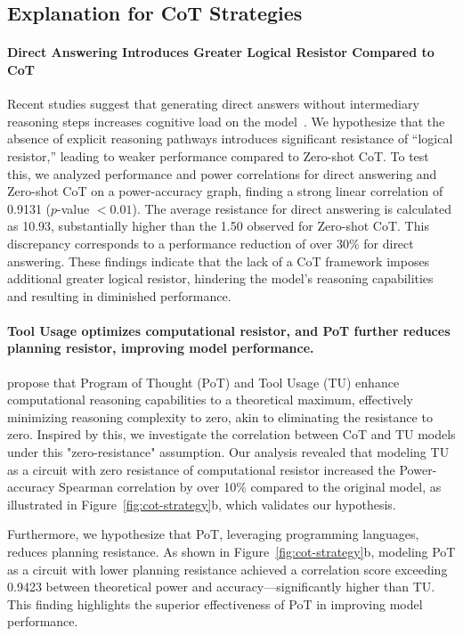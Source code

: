 \subsection{Explanation for CoT Strategies}
\paragraph{Direct Answering Introduces Greater Logical Resistor Compared to CoT}
Recent studies suggest that generating direct answers without intermediary reasoning steps increases cognitive load on the model~\citep{feng2024towards,kojima2022large}. We hypothesize that the absence of explicit reasoning pathways introduces significant resistance of ``logical resistor,'' leading to weaker performance compared to Zero-shot CoT. To test this, we analyzed performance and power correlations for direct answering and Zero-shot CoT on a power-accuracy graph, finding a strong linear correlation of 0.9131 ($p$-value $< 0.01$). The average resistance for direct answering is calculated as 10.93, substantially higher than the 1.50 observed for Zero-shot CoT. This discrepancy corresponds to a performance reduction of over 30\% for direct answering.
These findings indicate that the lack of a CoT framework imposes additional greater logical resistor, hindering the model’s reasoning capabilities and resulting in diminished performance.

\paragraph{Tool Usage optimizes computational resistor, and PoT further reduces planning resistor, improving model performance.}
\citet{chen2024unlocking} propose that Program of Thought (PoT) and Tool Usage (TU) enhance computational reasoning capabilities to a theoretical maximum, effectively minimizing reasoning complexity to zero, akin to eliminating the resistance to zero. Inspired by this, we investigate the correlation between CoT and TU models under this "zero-resistance" assumption.
Our analysis revealed that modeling TU as a circuit with zero resistance of computational resistor increased the Power-accuracy Spearman correlation by over 10\% compared to the original model, as illustrated in Figure~\ref{fig:cot-strategy}b, which  validates our hypothesis.

Furthermore, we hypothesize that PoT, leveraging programming languages, reduces planning resistance. As shown in Figure~\ref{fig:cot-strategy}b, modeling PoT as a circuit with lower planning resistance achieved a correlation score exceeding 0.9423 between theoretical power and accuracy—significantly higher than TU. This finding highlights the superior effectiveness of PoT in improving model performance.

